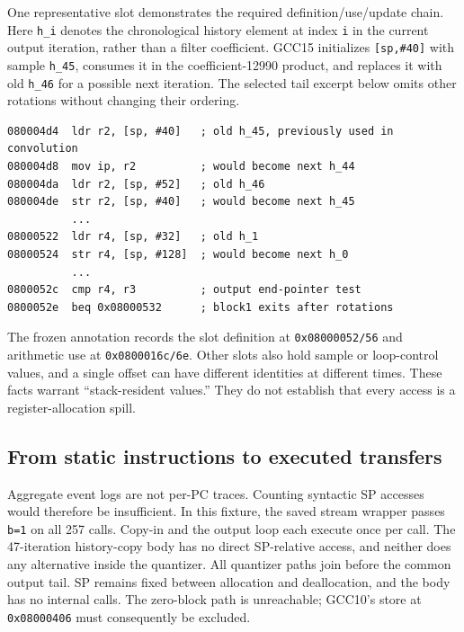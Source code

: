\documentclass[conference]{IEEEtran}
\begin{document}
One representative slot demonstrates the required definition/use/update
chain. Here \texttt{h\_i} denotes the chronological history element at
index \texttt{i} in the current output iteration, rather than a filter
coefficient. GCC15 initializes \texttt{{[}sp,\#40{]}} with sample
\texttt{h\_45}, consumes it in the coefficient-12990 product, and
replaces it with old \texttt{h\_46} for a possible next iteration. The
selected tail excerpt below omits other rotations without changing their
ordering.

\begin{Verbatim}[breaklines,breakanywhere,breaksymbolleft={},breaksymbolright={},fontsize=\scriptsize]
080004d4  ldr r2, [sp, #40]   ; old h_45, previously used in convolution
080004d8  mov ip, r2          ; would become next h_44
080004da  ldr r2, [sp, #52]   ; old h_46
080004de  str r2, [sp, #40]   ; would become next h_45
          ...
08000522  ldr r4, [sp, #32]   ; old h_1
08000524  str r4, [sp, #128]  ; would become next h_0
          ...
0800052c  cmp r4, r3          ; output end-pointer test
0800052e  beq 0x08000532      ; block1 exits after rotations
\end{Verbatim}

The frozen annotation records the slot definition at
\texttt{0x08000052/56} and arithmetic use at \texttt{0x0800016c/6e}.
Other slots also hold sample or loop-control values, and a single offset
can have different identities at different times. These facts warrant
``stack-resident values.'' They do not establish that every access is a
register-allocation spill.

\subsection{From static instructions to executed transfers}\label{from-static-instructions-to-executed-transfers}

Aggregate event logs are not per-PC traces. Counting syntactic SP
accesses would therefore be insufficient. In this fixture, the saved
stream wrapper passes \texttt{b=1} on all 257 calls. Copy-in and the
output loop each execute once per call. The 47-iteration history-copy
body has no direct SP-relative access, and neither does any alternative
inside the quantizer. All quantizer paths join before the common output
tail. SP remains fixed between allocation and deallocation, and the body
has no internal calls. The zero-block path is unreachable; GCC10's store
at \texttt{0x08000406} must consequently be excluded.
\end{document}
